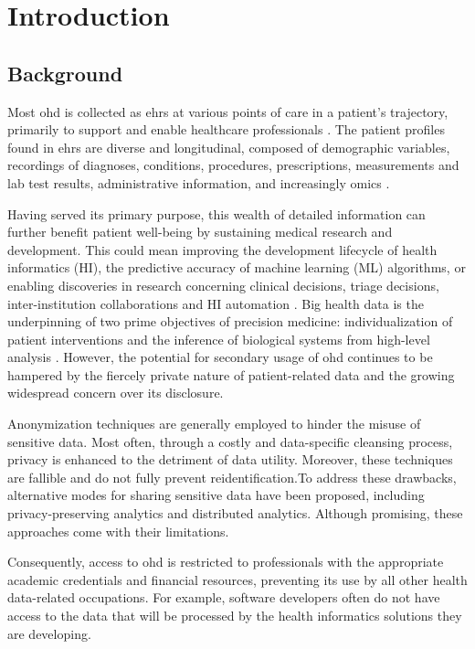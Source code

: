\section{Introduction}
\subsection{Background}
Most \gls{ohd} is collected as \glspl{ehr} at various points of care in a patient’s trajectory, primarily to support and enable healthcare professionals \cite{Cowie_2016}. The patient profiles found in \glspl{ehr} are diverse and longitudinal, composed of demographic variables, recordings of diagnoses, conditions, procedures, prescriptions, measurements and lab test results, administrative information, and increasingly omics \cite{Ohdsi2020-vf}.\par
Having served its primary purpose, this wealth of detailed information can further benefit patient well-being by sustaining medical research and development. This could mean improving the development lifecycle of health informatics (HI), the predictive accuracy of machine learning (ML) algorithms, or enabling discoveries in research concerning clinical decisions, triage decisions, inter-institution collaborations and HI automation \cite{Rudin_2020}. Big health data is the underpinning of two prime objectives of precision medicine: individualization of patient interventions and the inference of biological systems from high-level analysis \cite{Capobianco2020}. However, the potential for secondary usage of \gls{ohd} continues to be hampered by the fiercely private nature of patient-related data and the growing widespread concern over its disclosure.\par
Anonymization techniques are generally employed to hinder the misuse of sensitive data. Most often, through a costly and data-specific cleansing process, privacy is enhanced to the detriment of data utility. Moreover, these techniques are fallible and do not fully prevent reidentification.To address these drawbacks, alternative modes for sharing sensitive data have been proposed, including privacy-preserving analytics and distributed analytics. Although promising, these approaches come with their limitations.\par
Consequently, access to \gls{ohd} is restricted to professionals with the appropriate academic credentials and financial resources, preventing its use by all other health data-related occupations. For example, software developers often do not have access to the data that will be processed by the health informatics solutions they are developing.
